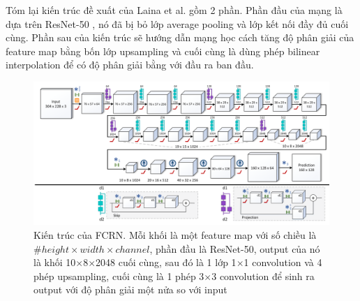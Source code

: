 Tóm lại kiến trúc đề xuất của Laina et al.\cite{laina2016deeper} gồm 2 phần. Phần đầu của mạng là dựa trên ResNet-50 \cite{KHe2015}, nó đã bị bỏ lớp average pooling và lớp kết nối đầy đủ cuối cùng. Phần sau của kiến trúc sẽ hướng dẫn mạng học cách tăng độ phân giải của feature map bằng bốn lớp upsampling và cuối cùng là dùng phép bilinear interpolation để có độ phân giải bằng với đầu ra ban đầu.
 \begin{center}
         \begin{figure}[H]
         \begin{center}
           \includegraphics[scale=0.35]{image/LainaNet}
          \end{center}
          \caption{Kiến trúc của FCRN. Mỗi khối là một feature map với số chiều là $\#height\times width\times channel$, phần đầu là ResNet-50\cite{KHe2015}, output của nó là khối 10$\times$8$\times$2048 cuối cùng, sau đó là 1 lớp 1$\times$1 convolution và 4 phép upsampling, cuối cùng là 1 phép 3$\times$3 convolution để sinh ra output với độ phân giải một nửa so với input }
          \label{ref_sigmoid}
          \end{figure}
 \end{center}
